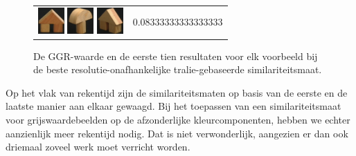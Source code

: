\begin{figure}[tbp]
\begin{center}
\begin{tabular}{m{11cm} | m{3cm} |}
\includegraphics[width=1cm]{coil/beeld-43.eps}
\includegraphics[width=1cm]{coil/beeld-3.eps}
\includegraphics[width=1cm]{coil/beeld-46.eps}
& {\scriptsize 0.08333333333333333}
\end{tabular}
\caption{\label{fig:results_beste_tralie_pixelgeb}De GGR-waarde en de eerste tien resultaten voor elk voorbeeld bij de beste resolutie-onafhankelijke tralie-gebaseerde similariteitsmaat.}
\end{center}
\end{figure}

Op het vlak van rekentijd zijn de similariteitsmaten op basis van de eerste en de laatste manier
aan elkaar gewaagd. Bij het toepassen van een similariteitsmaat voor grijswaardebeelden op de 
afzonderlijke kleurcomponenten, hebben we echter aanzienlijk meer rekentijd nodig. Dat is niet
verwonderlijk, aangezien er dan ook driemaal zoveel werk moet verricht worden.
